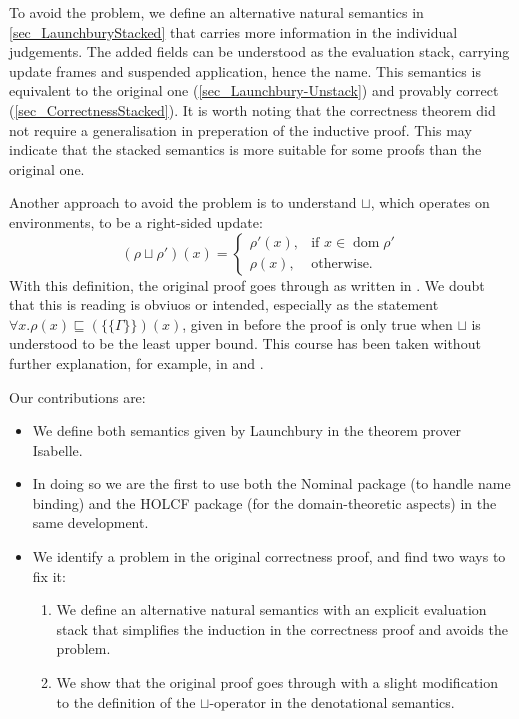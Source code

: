 \documentclass[11pt,a4paper,parskip=half]{scrartcl}
\begin{document}
To avoid the problem, we define an alternative natural semantics in \ref{sec_LaunchburyStacked} that carries more information in the individual judgements. The added fields can be understood as the evaluation stack, carrying update frames and suspended application, hence the name. This semantics is equivalent to the original one (\ref{sec_Launchbury-Unstack}) and provably correct (\ref{sec_CorrectnessStacked}). It is worth noting that the correctness theorem did not require a generalisation in preperation of the inductive proof. This may indicate that the stacked semantics is more suitable for some proofs than the original one.

Another approach to avoid the problem is to understand $\sqcup$, which operates on environments, to be a right-sided update:
\[
(\rho \sqcup \rho')(x) = 
\begin{cases}
\rho'(x), &\text{if } x \in \operatorname{dom} \rho' \\
\rho(x), &\text{otherwise.}
\end{cases}
\]
With this definition, the original proof goes through as written in \cite{launchbury}. We doubt that this is reading is obviuos or intended, especially as the statement $\forall x. \rho(x) \sqsubseteq (\{\!\!\{\Gamma\}\!\!\})(x)$, given in \cite{launchbury} before the proof is only true when $\sqcup$ is understood to be the least upper bound. This course has been taken without further explanation, for example, in \cite{parallel} and \cite{nakata_blackhole}.

Our contributions are:
 
\begin{itemize}
\item We define both semantics given by Launchbury in the theorem prover Isabelle.
\item In doing so we are the first to use both the Nominal package (to handle name binding) \cite{nominal} and the HOLCF \cite{holcf} package (for the domain-theoretic aspects) in the same development.
\item We identify a problem in the original correctness proof, and find two ways to fix it:
\begin{enumerate}
\item We define an alternative natural semantics with an explicit evaluation stack that simplifies the induction in the correctness proof and avoids the problem.
\item We show that the original proof goes through with a slight modification to the definition of the $\sqcup$-operator in the denotational semantics.
\end{enumerate}
\end{itemize}
\end{document}
